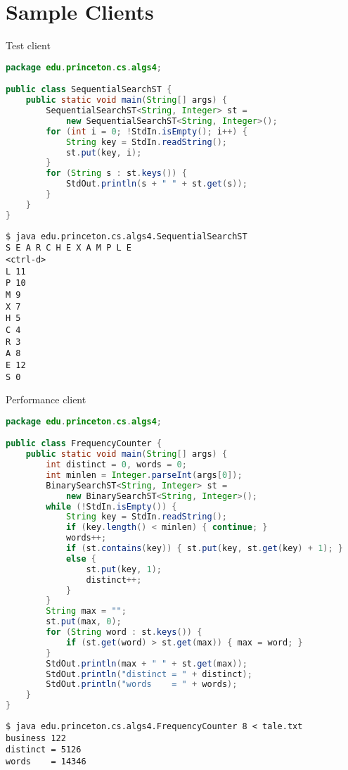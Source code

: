 \documentclass[8pt,a4paper,compress]{beamer}
\begin{document}
\section{Sample Clients}
\begin{frame}[fragile]
\pause

Test client
\begin{lstlisting}[language=Java]
package edu.princeton.cs.algs4;

public class SequentialSearchST {
    public static void main(String[] args) {
        SequentialSearchST<String, Integer> st = 
            new SequentialSearchST<String, Integer>();
        for (int i = 0; !StdIn.isEmpty(); i++) {
            String key = StdIn.readString();
            st.put(key, i);
        }
        for (String s : st.keys()) {
            StdOut.println(s + " " + st.get(s));
        }
    }
}
\end{lstlisting}

\pause

\begin{lstlisting}[language={}]
$ java edu.princeton.cs.algs4.SequentialSearchST 
S E A R C H E X A M P L E
<ctrl-d>
L 11
P 10
M 9
X 7
H 5
C 4
R 3
A 8
E 12
S 0
\end{lstlisting}
\end{frame}

\begin{frame}[fragile]
\pause

Performance client
\begin{lstlisting}[language=Java]
package edu.princeton.cs.algs4;

public class FrequencyCounter {
    public static void main(String[] args) {
        int distinct = 0, words = 0;
        int minlen = Integer.parseInt(args[0]);
        BinarySearchST<String, Integer> st = 
            new BinarySearchST<String, Integer>();
        while (!StdIn.isEmpty()) {
            String key = StdIn.readString();
            if (key.length() < minlen) { continue; }
            words++;
            if (st.contains(key)) { st.put(key, st.get(key) + 1); }
            else {
                st.put(key, 1);
                distinct++;
            }
        }
        String max = "";
        st.put(max, 0);
        for (String word : st.keys()) {
            if (st.get(word) > st.get(max)) { max = word; }
        }
        StdOut.println(max + " " + st.get(max));
        StdOut.println("distinct = " + distinct);
        StdOut.println("words    = " + words);
    }
}
\end{lstlisting}

\pause

\begin{lstlisting}[language={}]
$ java edu.princeton.cs.algs4.FrequencyCounter 8 < tale.txt 
business 122
distinct = 5126
words    = 14346
\end{lstlisting}
\end{frame}
\end{document}

